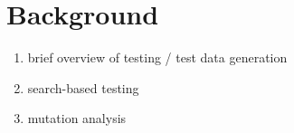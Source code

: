 \section{Background}
\begin{enumerate}
\item brief overview of testing / test data generation
\item search-based testing
\item mutation analysis
\end{enumerate}
